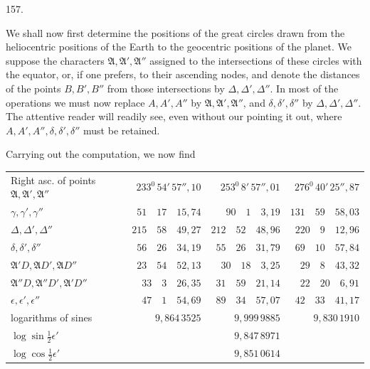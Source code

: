 \par{}\medskip
{}\hypertarget{native-213-article157}{}
\begin{center}157.\end{center}
We shall now first determine the positions of the great circles drawn from the heliocentric positions of the Earth to the geocentric positions of the planet. We suppose the characters $\mathfrak A,\mathfrak A',\mathfrak A''$ assigned to the intersections of these circles with the equator, or, if one prefers, to their ascending nodes, and denote the distances of the points $B,B',B''$ from those intersections by $\Delta,\Delta',\Delta''$. In most of the operations we must now replace $A,A',A''$ by $\mathfrak A,\mathfrak A',\mathfrak A''$, and $\delta,\delta',\delta''$ by $\Delta,\Delta',\Delta''$. The attentive reader will readily see, even without our pointing it out, where $A,A',A'',\delta,\delta',\delta''$ must be retained.

Carrying out the computation, we now find
\begin{center}
\begingroup\footnotesize\setlength{\tabcolsep}{3pt}\renewcommand{\arraystretch}{1.25}
\begin{tabular}{l|r|r|r}
\shortstack{Right asc. of points\\$\mathfrak A,\mathfrak A',\mathfrak A''$} & $233^0\,54'\,57''{,}10$ & $253^0\,8'\,57''{,}01$ & $276^0\,40'\,25''{,}87$\\
$\gamma,\gamma',\gamma''$ & $51\quad17\quad15{,}74$ & $90\quad1\quad3{,}19$ & $131\quad59\quad58{,}03$\\
$\Delta,\Delta',\Delta''$ & $215\quad58\quad49{,}27$ & $212\quad52\quad48{,}96$ & $220\quad9\quad12{,}96$\\
$\delta,\delta',\delta''$ & $56\quad26\quad34{,}19$ & $55\quad26\quad31{,}79$ & $69\quad10\quad57{,}84$\\
$\mathfrak A'D,\mathfrak AD',\mathfrak AD''$ & $23\quad54\quad52{,}13$ & $30\quad18\quad3{,}25$ & $29\quad8\quad43{,}32$\\
$\mathfrak A''D,\mathfrak A''D',\mathfrak A'D''$ & $33\quad3\quad26{,}35$ & $31\quad59\quad21{,}14$ & $22\quad20\quad6{,}91$\\
$\epsilon,\epsilon',\epsilon''$ & $47\quad1\quad54{,}69$ & $89\quad34\quad57{,}07$ & $42\quad33\quad41{,}17$\\
logarithms of sines & $9{,}864\,3525$ & $9{,}999\,9885$ & $9{,}830\,1910$\\
$\log\sin\tfrac12\epsilon'$ & & $9{,}847\,8971$ &\\
$\log\cos\tfrac12\epsilon'$ & & $9{,}851\,0614$ &
\end{tabular}\endgroup
\end{center}

